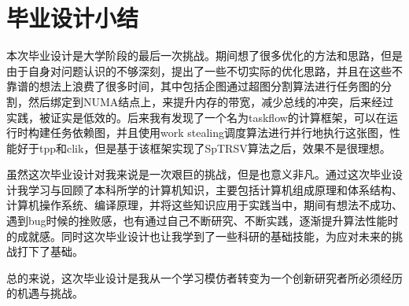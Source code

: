 \chapter*{毕业设计小结}

本次毕业设计是大学阶段的最后一次挑战。期间想了很多优化的方法和思路，但是由于自身对问题认识的不够深刻，提出了一些不切实际的优化思路，并且在这些不靠谱的想法上浪费了很多时间，其中包括企图通过超图分割算法进行任务图的分割，然后绑定到NUMA结点上，来提升内存的带宽，减少总线的冲突，后来经过实践，被证实是低效的。后来我有发现了一个名为taskflow的计算框架，可以在运行时构建任务依赖图，并且使用work stealing调度算法进行并行地执行这张图，性能好于tpp和clik，但是基于该框架实现了SpTRSV算法之后，效果不是很理想。

虽然这次毕业设计对我来说是一次艰巨的挑战，但是也意义非凡。通过这次毕业设计我学习与回顾了本科所学的计算机知识，主要包括计算机组成原理和体系结构、计算机操作系统、编译原理，并将这些知识应用于实践当中，期间有想法不成功、遇到bug时候的挫败感，也有通过自己不断研究、不断实践，逐渐提升算法性能时的成就感。同时这次毕业设计也让我学到了一些科研的基础技能，为应对未来的挑战打下了基础。

总的来说，这次毕业设计是我从一个学习模仿者转变为一个创新研究者所必须经历的机遇与挑战。


\clearpage
\endinput